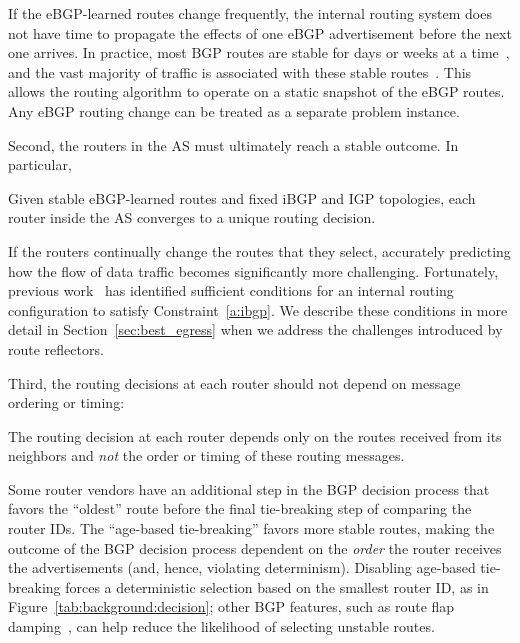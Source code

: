 \vspace*{0.1in}
\noindent
If the eBGP-learned routes change frequently, the internal routing
system does not have time to propagate the effects of one eBGP
advertisement before the next one arrives.  In practice, most BGP
routes are stable for days or weeks at a time~\cite{labovitz99}, and
the vast majority of traffic is associated with these stable
routes~\cite{Rexford:stability2002}.  This allows the routing algorithm to operate on
a static snapshot of the eBGP routes.  Any eBGP routing change can be
treated as a separate problem instance.

Second, the routers in the AS must ultimately reach a stable
outcome.  In particular,

\begin{constraint}
\label{a:ibgp}
Given stable eBGP-learned routes and fixed iBGP and IGP topologies,
each router inside the AS converges to a unique routing decision.
\end{constraint}

\vspace*{0.1in}
\noindent
If the routers continually change the routes that they select,
accurately predicting how the flow of data traffic becomes significantly
more challenging.  Fortunately, previous work~\cite{Griffin2002} has
identified sufficient conditions for an internal routing configuration
to satisfy Constraint~\ref{a:ibgp}.  We describe these conditions in
more detail in Section~\ref{sec:best_egress} when we address the
challenges introduced by route reflectors.

Third, the routing decisions at each router should not depend on
message ordering or timing:

\begin{constraint}
\label{a:determ}
The routing decision at each router depends only on the routes received
from its neighbors and {\em not} the order or timing of these routing
messages. 
\end{constraint}

\vspace*{0.1in}
\noindent
Some router vendors have an additional step in the BGP
decision process that favors the ``oldest'' route before the final
tie-breaking step of comparing the router IDs.  The ``age-based
tie-breaking'' favors more stable routes, making the outcome of the
BGP decision process dependent on the {\em order\/} the router
receives the advertisements (and, hence, violating determinism).
Disabling age-based tie-breaking forces 
a deterministic selection based on the smallest router ID, as in
Figure~\ref{tab:background:decision}; other BGP features, such as route flap
damping~\cite{rfc2439}, can help reduce the likelihood of selecting
unstable routes.


